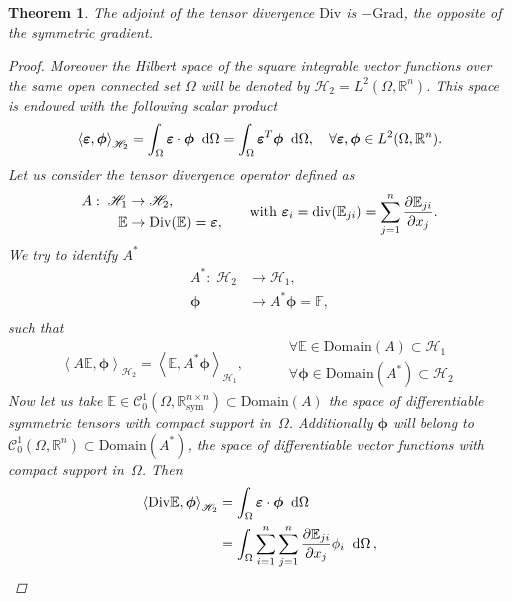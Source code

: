 \documentclass[preprint,12pt]{elsarticle}
\newtheorem{theorem}{Theorem}
\begin{document}
\begin{theorem}{The adjoint of the tensor divergence $\mathrm{Div}$ is $- \mathrm{Grad}$, the opposite of the symmetric gradient.}
\begin{proof}
	 Moreover the Hilbert space of the square integrable vector functions over the same open connected set $\Omega$ will be denoted by $\mathscr{H}_2 = L^2(\Omega, \mathbb{R}^{n})$. This space is endowed with the following scalar product
	 \[\left\langle \bm{\varepsilon} , \bm{\phi} \right\rangle_{\mathscr{H}_2} = \int_{\Omega}  \bm{\varepsilon} \cdot \bm{\phi} \; \d\Omega = \int_{\Omega} \bm{\varepsilon}^T \bm{\phi}\; \d\Omega, \quad \forall \bm{\varepsilon}, \bm{\phi} \in L^2(\Omega, \mathbb{R}^{n}). \]
	 Let us consider the tensor divergence operator defined as 
	 \[
	 \begin{aligned}
	 A: \; \mathscr{H}_1& \rightarrow \mathscr{H}_2, \\
	 \mathbb{E}& \rightarrow \mathrm{Div}(\mathbb{E}) = \bm{\varepsilon}, \\
	 \end{aligned}
	 \qquad \text{with } \bm{\varepsilon}_i = \mathrm{div}(\mathbb{E}_{ji}) = \sum_{j = 1}^n \diffp{\mathbb{E}_{ji}}{x_j}.
	 \]
	 We try to identify $A^*$
	 \[
	 \begin{aligned}
	 A^*: \; \mathscr{H}_2& \rightarrow \mathscr{H}_1, \\
	 \bm{\phi}& \rightarrow  A^* \bm{\phi} = \mathbb{F}, \\
	 \end{aligned}
	 \]
	 such that \[
	 	 \left\langle A \mathbb{E} , \bm{\phi} \right\rangle_{\mathscr{H}_2} = \left\langle \mathbb{E} , A^* \bm{\phi} \right\rangle_{\mathscr{H}_1},
	 \begin{aligned} \qquad
	 &\forall \mathbb{E} \in \mathrm{Domain}(A) \subset \mathscr{H}_1 \\
	 &\forall \bm{\phi} \in \mathrm{Domain}(A^*) \subset \mathscr{H}_2
	 \end{aligned}
	 \]
	 Now let us take $\mathbb{E} \in \mathcal{C}_0^1(\Omega, \mathbb{R}^{n \times n}_{\text{sym}}) \subset \mathrm{Domain}(A)$ the space of differentiable symmetric tensors with compact support in~$\Omega$. Additionally $\bm{\phi}$ will belong to $\mathcal{C}_0^1(\Omega, \mathbb{R}^n) \subset \mathrm{Domain}(A^*)$, the space of differentiable vector functions with compact support in~$\Omega$. Then
	 \[
	 \begin{aligned}
	 \left\langle \mathrm{Div}\mathbb{E} , \bm{\phi} \right\rangle_{\mathscr{H}_2} &= \int_{\Omega}  \bm{\varepsilon} \cdot \bm{\phi} \; \d\Omega\, \\
	 &= \int_{\Omega} \sum_{i=1}^n \sum_{j=1}^n \diffp{\mathbb{E}_{ji}}{x_j} \phi_i \; \d\Omega\,,  \\ 

\end{aligned}\]
\end{proof}
\end{theorem}
\end{document}
